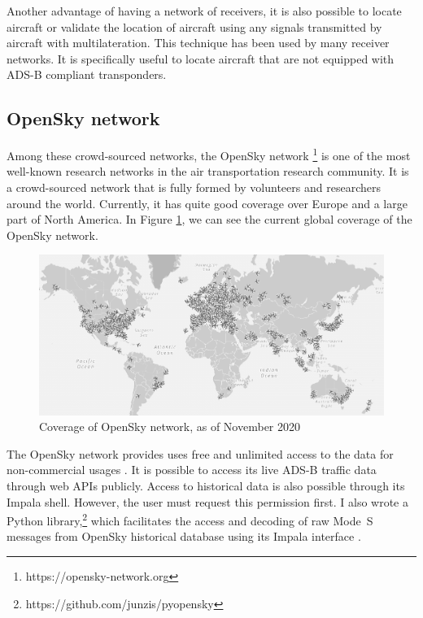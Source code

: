 Another advantage of having a network of receivers, it is also possible to locate aircraft or validate the location of aircraft using any signals transmitted by aircraft with multilateration\cite{kaune2012}. This technique has been used by many receiver networks. It is specifically useful to locate aircraft that are not equipped with ADS-B compliant transponders.

\subsection{OpenSky network}

Among these crowd-sourced networks, the OpenSky network \footnote{https://opensky-network.org} is one of the most well-known research networks in the air transportation research community. It is a crowd-sourced network that is fully formed by volunteers and researchers around the world. Currently, it has quite good coverage over Europe and a large part of North America. In Figure \ref{fig:opensky_coverage}, we can see the current global coverage of the OpenSky network.

\begin{figure}[ht]
    \centering
    \includegraphics[width=\columnwidth]{figures/conclusion/opensky.png}
    \caption{Coverage of OpenSky network, as of November 2020}
    \label{fig:opensky_coverage}
\end{figure}

The OpenSky network provides uses free and unlimited access to the data for non-commercial usages \cite{schafer2014opensky}. It is possible to access its live ADS-B traffic data through web APIs publicly. Access to historical data is also possible through its Impala shell. However, the user must request this permission first. I also wrote a Python library,\footnote{https://github.com/junzis/pyopensky} which facilitates the access and decoding of raw Mode~S messages from OpenSky historical database using its Impala interface \cite{sun2019pyopensky}. 

